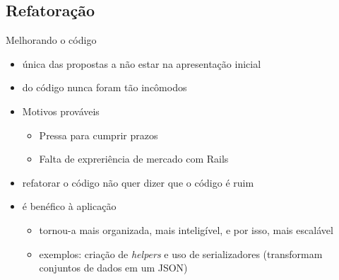 \documentclass[aspectratio=43,display]{beamer}
\begin{document}
  \subsection{Refatoração}\label{subsec:refatoracao}

  \begin{frame}{Melhorando o código}
    \begin{itemize}
      \item única das propostas a não estar na apresentação inicial \pause
      \item {} do código nunca foram tão incômodos \pause %
      \item Motivos prováveis \pause
      \begin{itemize}
        \item Pressa para cumprir prazos \pause %
        \item Falta de expreriência de mercado com Rails \pause %
      \end{itemize}
      \item refatorar o código não quer dizer que o código é ruim \pause %
      \item é benéfico à aplicação \pause
      \begin{itemize}
        \item tornou-a mais organizada, mais inteligível, e por isso, mais escalável \pause %
        \item exemplos: criação de \emph{helpers} e uso de serializadores (transformam conjuntos de dados em um JSON)
      \end{itemize}
    \end{itemize}
  \end{frame}
\end{document}
